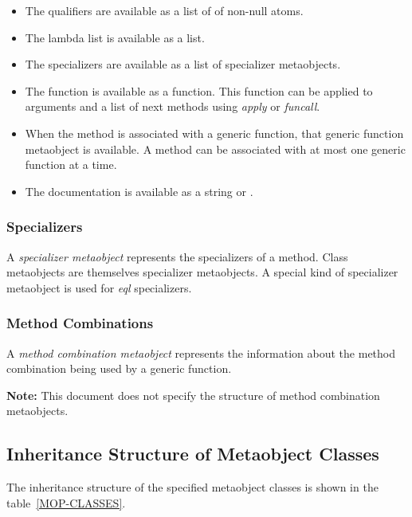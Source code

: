   \begin{itemize}
  \item 
    The qualifiers are available as a list of of non-null atoms.

  \item 
    The lambda list is available as a list.

  \item 
    The specializers are available as a list of specializer metaobjects. 

  \item 
    The function is available as a function. This function can be applied to
    arguments and a list of next methods using \emph{apply} or \emph{funcall}. 

  \item 
    When the method is associated with a generic function, that generic function
    metaobject is available. A method can be associated with at most one generic
    function at a time.

  \item 
    The documentation is available as a string or .
  \end{itemize}


\subsubsection{Specializers}

A \emph{specializer metaobject} represents the specializers of a method. Class
metaobjects are themselves specializer metaobjects. A special kind of
specializer metaobject is used for \emph{eql} specializers.

\subsubsection{Method Combinations}

A \emph{method combination metaobject} represents the information about the method
combination being used by a generic function. 

\textbf{Note:} This document does not specify the structure of method
combination metaobjects.  

\subsection{Inheritance Structure of Metaobject Classes}

The inheritance structure of the specified metaobject classes is shown in the
table~\ref{MOP-CLASSES}.

